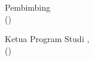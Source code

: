 \begin{center}

    Pembimbing \\[1.75cm]
    
    
    (\pembimbing ) \\
    \pembimbingNIDN
  
    
    
    
        
    
    
        



\vfill  

    
    Ketua Program Studi \program, \\[1.75cm]
    
    
    (\kaprodi) \\
    \kaprodiNIDN
    
    
\end{center}




\newpage